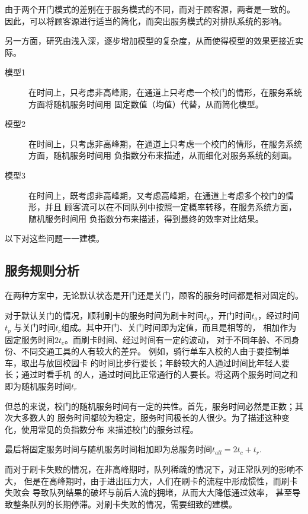 \documentclass{article}
\begin{document}
由于两个开门模式的差别在于服务模式的不同，而对于顾客源，两者是一致的。
因此，可以将顾客源进行适当的简化，而突出服务模式的对排队系统的影响。

另一方面，研究由浅入深，逐步增加模型的复杂度，从而使得模型的效果更接近实际。
\begin{description}
    \item[模型1] 在时间上，只考虑非高峰期，在通道上只考虑一个校门的情形，在服务系统方面将随机服务时间用
    固定数值（均值）代替，从而简化模型。
    \item[模型2] 在时间上，只考虑非高峰期，在通道上只考虑一个校门的情形，在服务系统方面，随机服务时间用
    负指数分布来描述，从而细化对服务系统的刻画。
    \item[模型3] 在时间上，既考虑非高峰期，又考虑高峰期，在通道上考虑多个校门的情形，并且
    顾客流可以在不同队列中按照一定概率转移，在服务系统方面，随机服务时间用
    负指数分布来描述，得到最终的效率对比结果。
\end{description}

以下对这些问题一一建模。

\subsection{服务规则分析}
	在两种方案中，无论默认状态是开门还是关门，顾客的服务时间都是相对固定的。

    对于默认关门的情况，顺利刷卡的服务时间为刷卡时间$t_{g}$，开门时间$t_{o}$，经过时间$t_{p}$
    与关门时间$t_{c}$组成。其中开门、关门时间即为定值，而且是相等的，
    相加作为固定服务时间$2t_{c}$。而刷卡时间、经过时间有一定的波动，
    对于不同年龄、不同身份、不同交通工具的人有较大的差异。
    例如，骑行单车入校的人由于要控制单车，取出与放回校园卡
    的时间比步行要长；年龄较大的人通过时间比年轻人要长；通过时看手机
    的人，通过时间比正常通行的人要长。将这两个服务时间之和即为随机服务时间$t_{r}$
    
    但总的来说，校门的随机服务时间有一定的共性。首先，服务时间必然是正数；其次大多数人的
    服务时间都较为稳定，服务时间极长的人很少。为了描述这种变化，使用常见的负指数分布
    来描述校门的服务过程。

    最后将固定服务时间与随机服务时间相加即为总服务时间$t_{all}=2t_{c}+t_{r}$.

    而对于刷卡失败的情况，在非高峰期时，队列稀疏的情况下，对正常队列的影响不大，
    但是在高峰期时，由于进出压力大，人们在刷卡的流程中形成惯性，而刷卡失败会
    导致队列结果的破坏与前后人流的拥堵，从而大大降低通过效率，
    甚至导致整条队列的长期停滞。对刷卡失败的情况，需要细致的建模。
\end{document}
